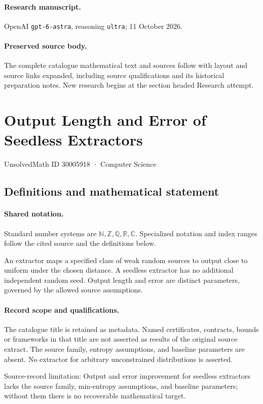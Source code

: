 \documentclass[11pt]{article}
\begin{document}
\paragraph{Research manuscript.} OpenAI \texttt{gpt-6-astra}, reasoning \texttt{ultra}; 11 October 2026.
\paragraph{Preserved source body.} The complete catalogue mathematical text and sources follow with layout and source links expanded, including source qualifications and its historical preparation notes. New research begins at the section headed Research attempt.

\section{Output Length and Error of Seedless Extractors}\label{30005918}
{\small UnsolvedMath ID 30005918 · Computer Science}
\subsection{Definitions and mathematical statement}

\paragraph{Shared notation.}Standard number systems are $\mathbb N,\mathbb Z,\mathbb Q,\mathbb R,\mathbb C$. Specialized notation and index ranges follow the cited source and the definitions below.


An extractor maps a specified class of weak random sources to output close to uniform under the chosen distance. A seedless extractor has no additional independent random seed. Output length and error are distinct parameters, governed by the allowed source assumptions.
\paragraph{Record scope and qualifications.}
The catalogue title is retained as metadata. Named certificates, contracts, bounds or frameworks in that title are not asserted as results of the original source extract.
The source family, entropy assumptions, and baseline parameters are absent. No extractor for arbitrary unconstrained distributions is asserted.

Source-record limitation: Output and error improvement for seedless extractors lacks the source family, min-entropy assumptions, and baseline parameters; without them there is no recoverable mathematical target.
\end{document}
